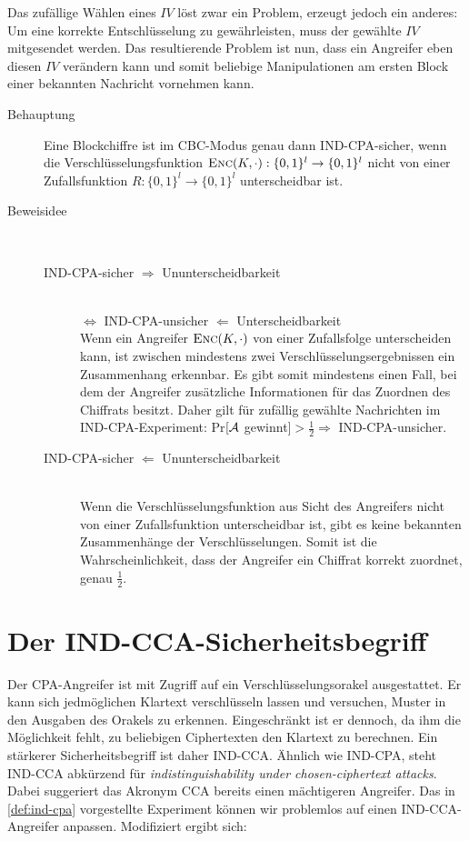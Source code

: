 Das zufällige Wählen eines $IV$ löst zwar ein Problem, erzeugt jedoch ein anderes: Um eine korrekte Entschlüsselung zu gewährleisten, muss der gewählte $IV$ mitgesendet werden. Das resultierende Problem ist nun, dass ein Angreifer eben diesen $IV$ verändern kann und somit beliebige Manipulationen am ersten Block einer bekannten Nachricht vornehmen kann.

\begin{description} 
	\item[Behauptung] Eine Blockchiffre ist im CBC-Modus genau dann IND-CPA-sicher, wenn die Verschlüsselungsfunktion $\textsc{Enc}(K,\cdot): \{0,1\}^l \rightarrow
	\{0,1\}^l$ nicht von einer Zufallsfunktion $R: \{0,1\}^l \rightarrow \{0,1\}^l$ unterscheidbar ist.
	\item[Beweisidee]~
	\begin{description}
		\item[IND-CPA-sicher $\Rightarrow$ Ununterscheidbarkeit]~\\
		$\Leftrightarrow$ IND-CPA-unsicher $\Leftarrow$ Unterscheidbarkeit~\\
		Wenn ein Angreifer $\textsc{Enc}(K, \cdot)$ von einer Zufallsfolge unterscheiden kann, ist zwischen mindestens zwei Verschlüsselungsergebnissen ein Zusammenhang erkennbar. Es gibt somit mindestens einen Fall, bei dem der Angreifer zusätzliche Informationen für das Zuordnen des Chiffrats besitzt. Daher gilt für zufällig gewählte Nachrichten im IND-CPA-Experiment: Pr$[\mathcal{A}$ gewinnt$] > \frac{1}{2} \Rightarrow$ IND-CPA-unsicher.
		\item[IND-CPA-sicher $\Leftarrow$ Ununterscheidbarkeit]~\\
		Wenn die Verschlüsselungsfunktion aus Sicht des Angreifers nicht von einer Zufallsfunktion unterscheidbar ist, gibt es keine bekannten Zusammenhänge der Verschlüsselungen. Somit ist die Wahrscheinlichkeit, dass der Angreifer ein Chiffrat korrekt zuordnet, genau $\frac{1}{2}$.
	\end{description}
\end{description}

\section{Der IND-CCA-Sicherheitsbegriff}
Der CPA-Angreifer ist mit Zugriff auf ein Verschlüsselungsorakel ausgestattet. Er kann sich jedmöglichen Klartext verschlüsseln lassen und
versuchen, Muster in den Ausgaben des Orakels zu erkennen. Eingeschränkt ist er dennoch, da ihm die Möglichkeit fehlt, zu beliebigen
Ciphertexten den Klartext zu berechnen. Ein stärkerer Sicherheitsbegriff ist daher IND-CCA. Ähnlich wie IND-CPA, steht IND-CCA abkürzend für \emph{indistinguishability under chosen-ciphertext attacks}. Dabei suggeriert das Akronym CCA bereits einen mächtigeren Angreifer. Das in \ref{def:ind-cpa} vorgestellte Experiment können wir problemlos auf einen IND-CCA-Angreifer anpassen. Modifiziert ergibt sich:

